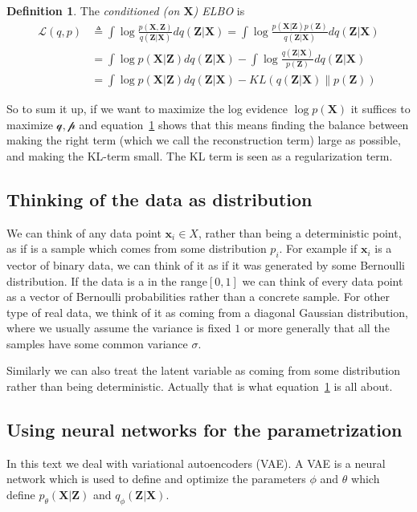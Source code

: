 \documentclass[11pt, a4paper]{report}
\theoremstyle{plain}
\theoremstyle{definition}
\newtheorem{mydef}{Definition}[chapter]
\theoremstyle{remark}
\newcommand{\X}{\mathbf{X}}
\newcommand{\x}{\mathbf{x}}
\newcommand{\Z}{\mathbf{Z}}
\begin{document}
\begin{mydef}
\label{eq:elbo_conditioned}
The \emph{conditioned (on $\X$) ELBO} is
\begin{equation}
\begin{aligned}
\mathcal{L}(q,p) &\triangleq \int \log \frac{p(\X,\Z)}{q(\Z|\X)}dq(\Z|\X) 
= \int \log \frac{p(\X |\Z) p(\Z)}{q(\Z|\X)}dq(\Z|\X) \\
&= \int \log p(\X | \Z)dq(\Z|\X) - \int \log \frac{q(\Z|\X)}{p(\Z)}dq(\Z|\X) \\
&= \int \log p(\X | \Z)dq(\Z|\X) - KL(q(\Z|\X) \| p(\Z))
\end{aligned}
\end{equation}
\end{mydef}

So to sum it up, if we want to maximize the log evidence $\log p(\X)$ it
suffices to maximize $\mathcal{q,p}$ and equation~\ref{eq:elbo_conditioned}
shows that this means finding the balance between making 
the right term (which we call the reconstruction term) large as possible, 
and making the KL-term small.
The KL term is seen as a regularization term.

\subsection{Thinking of the data as distribution}
We can think of any data point $\x_i \in X$, rather than being a deterministic
point, as if is a sample which comes from some distribution $p_i$.
For example if $\x_i$ is a vector of binary data, we can think of it as if it
was generated by some Bernoulli distribution. If the data is a in the
range$[0,1]$ we can think of every data point as a vector of Bernoulli 
probabilities rather than a concrete sample.
For other type of real data, we think of it as coming from a diagonal Gaussian
distribution, where we usually assume the variance is fixed $1$ or more 
generally that all the samples have some common variance $\sigma$.

Similarly we can also treat the latent variable as coming from some distribution
rather than being deterministic. Actually that is what
equation~\ref{eq:elbo_conditioned}
is all about.

\subsection{Using neural networks for the parametrization}
In this text we deal with variational autoencoders (VAE).
A VAE is a neural network which is used to define and optimize the parameters
$\phi$ and $\theta$ which define $p_{\theta}(\X | \Z)$ and $q_{\phi}(\Z | \X)$.
\end{document}
